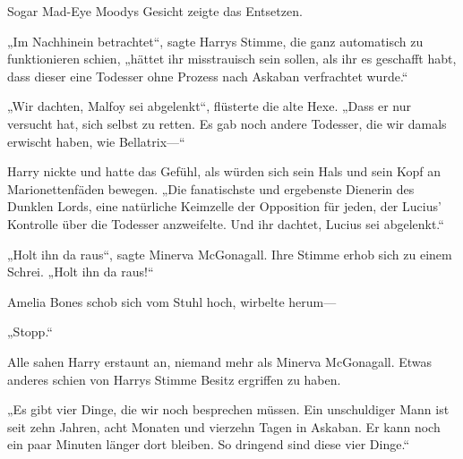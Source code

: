 Sogar Mad-Eye Moodys Gesicht zeigte das Entsetzen.

„Im Nachhinein betrachtet“, sagte Harrys Stimme, die ganz automatisch zu funktionieren schien, „hättet ihr misstrauisch sein sollen, als ihr es geschafft habt, dass dieser eine Todesser ohne Prozess nach Askaban verfrachtet wurde.“

„Wir dachten, Malfoy sei abgelenkt“, flüsterte die alte Hexe. „Dass er nur versucht hat, sich selbst zu retten. Es gab noch andere Todesser, die wir damals erwischt haben, wie Bellatrix—“

Harry nickte und hatte das Gefühl, als würden sich sein Hals und sein Kopf an Marionettenfäden bewegen.
„Die fanatischste und ergebenste Dienerin des Dunklen Lords, eine natürliche Keimzelle der Opposition für jeden, der Lucius' Kontrolle über die Todesser anzweifelte. Und ihr dachtet, Lucius sei abgelenkt.“

„Holt ihn da raus“, sagte Minerva McGonagall. Ihre Stimme erhob sich zu einem Schrei. „Holt ihn da raus!“

Amelia Bones schob sich vom Stuhl hoch, wirbelte herum—

„Stopp.“

Alle sahen Harry erstaunt an, niemand mehr als Minerva McGonagall. Etwas anderes schien von Harrys Stimme Besitz ergriffen zu haben.

„Es gibt vier Dinge, die wir noch besprechen müssen. Ein unschuldiger Mann ist seit zehn Jahren, acht Monaten und vierzehn Tagen in Askaban. Er kann noch ein paar Minuten länger dort bleiben. So dringend sind diese vier Dinge.“


